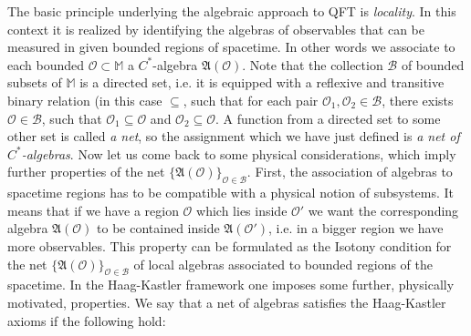 \documentclass[11pt]{article}
\newcommand{\fA}{\mathfrak{A}}
\newcommand{\Ocal}{\mathcal{O}}
\newcommand{\M}{\mathbb{M}} 	     %
\newcommand{\1}{\mathds{1}}                         %
\begin{document}
The basic principle underlying the algebraic approach to QFT is \textit{locality}. In this context it is realized by identifying the algebras of observables that can be measured in given bounded regions of spacetime. In other words we associate to each bounded $\Ocal\subset \M$ a $C^*$-algebra $\fA(\Ocal)$.  Note that the collection $\mathcal{B}$ of bounded subsets of $\M$ is a directed set, i.e. it is equipped with a reflexive and transitive binary relation (in this case $\subseteq$, such that for each pair $\Ocal_1,\Ocal_2\in\mathcal{B}$, there exists $\Ocal\in\mathcal{B}$, such that $\Ocal_1\subseteq \Ocal$ and $\Ocal_2\subseteq \Ocal$. A function from a directed set to some other set is called \textit{a net}, so the assignment which we have just defined is \textit{a net of $C^*$-algebras}. Now let us come back to some physical considerations, which imply further properties of the net $\{\fA(\Ocal)\}_{\Ocal\in\mathcal{B}}$. First, the association of algebras to spacetime regions has to be compatible with a physical notion of subsystems. It means that if we have a region $\Ocal$ which lies inside $\Ocal'$ we want the corresponding algebra $\fA(\Ocal)$ to be contained inside $\fA(\Ocal')$, i.e. in a bigger region we have more observables. This property can be formulated as the Isotony condition for the net $\{\fA(\Ocal)\}_{\Ocal\in\mathcal{B}}$ of local algebras associated to bounded regions of the spacetime. In the Haag-Kastler framework one imposes some further, physically motivated, properties. We say that a net of algebras satisfies the Haag-Kastler axioms if the following hold:
\end{document}
